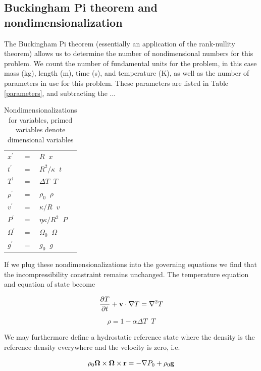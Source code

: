 \documentclass[extra,mreferee]{gji}
\newif\ifdetail
\begin{document}
\ifdetail
\subsection{Buckingham Pi theorem and nondimensionalization}
The Buckingham Pi theorem (essentially an application of the rank-nullity theorem) allows us to determine the number of nondimensional numbers for this problem.
We count the number of fundamental units for the problem, in this case mass (kg), length (m), time (s), and temperature (K), as well as the number of parameters in use for this problem.  
These parameters are listed in Table \ref{parameters}, and subtracting the ...

\begin{table}
\centering
\caption{Nondimensionalizations for variables, primed variables denote dimensional variables}
\label{nondim_convert}
\begin{tabular}{@{}lll}
$x^\prime$ &=& $R \;\; x$ \\
$t^\prime$ &=& $R^2/\kappa \;\; t$ \\
$T^\prime$ &=& $\Delta T \;\; T$ \\
$\rho^\prime$ &=& $\rho_0 \;\; \rho$\\
$v^\prime$ &=& $\kappa/R \;\; v$ \\
$P^\prime$ &=& $\eta \kappa/R^2 \;\; P$ \\
$\Omega^\prime$ &=& $\Omega_0 \;\; \Omega$ \\
$g^\prime$ &=& $g_0 \;\; g$
\end{tabular}
\end{table}

If we plug these nondimensionalizations into the governing equations we find that the incompressibility constraint remains unchanged.  The temperature equation and equation of state become

\begin{equation}
\frac{\partial T}{\partial t} + {\bf v} \cdot \nabla T = \nabla^2 T
\end{equation}

\begin{equation}
\rho = 1 - \alpha \Delta T \;\;  T
\end{equation}

We may furthermore define a hydrostatic reference state where the density is the reference density everywhere and the velocity is zero, i.e.

\begin{equation}
 \rho_0{\bf \Omega \times \Omega \times r}= - \nabla P_0 + \rho_0 {\bf g}
\end{equation}
\end{document}
